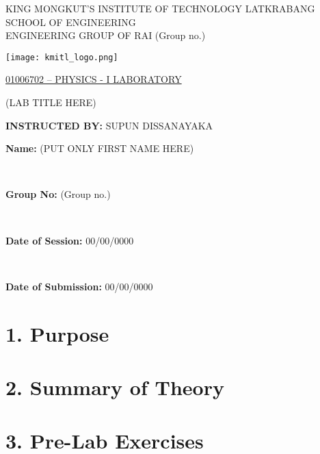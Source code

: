 \documentclass[12pt,a4paper]{article}
\newcommand{\groupNumber}{(Group no.)} %
\newcommand{\labTitle}{(LAB TITLE HERE)} %
\newcommand{\studentNames}{(PUT ONLY FIRST NAME HERE)} %
\newcommand{\sessionDate}{00/00/0000} %
\newcommand{\submissionDate}{00/00/0000} %
\begin{document}
\begin{center}
	\vspace*{36pt}

	{\fontsize{14}{16}\selectfont
		KING MONGKUT’S INSTITUTE OF TECHNOLOGY LATKRABANG\\
		SCHOOL OF ENGINEERING\\
		ENGINEERING GROUP OF RAI \groupNumber
	}

	\vspace{42pt}

	\texttt{[image: kmitl\_logo.png]}

	\vspace{56pt}

	{\fontsize{16}{18}\selectfont
		\underline{01006702 – PHYSICS - I LABORATORY}\\
	}

	\vspace{32pt}

	\labTitle

	\vspace{60pt}

	\begin{flushleft}
		\textbf{INSTRUCTED BY:} \quad SUPUN DISSANAYAKA
	\end{flushleft}

	\vfill

	\begin{flushright}
		\parbox{8cm}{\textbf{Name:} \studentNames}\\
		\parbox{8cm}{\textbf{Group No:} \groupNumber}\\
		\parbox{8cm}{\textbf{Date of Session:} \sessionDate}\\
		\parbox{8cm}{\textbf{Date of Submission:} \submissionDate}
	\end{flushright}

	\vspace{36pt}
\end{center}

\newpage

\section*{1. Purpose}



\section*{2. Summary of Theory}



\section*{3. Pre-Lab Exercises}

\end{document}
